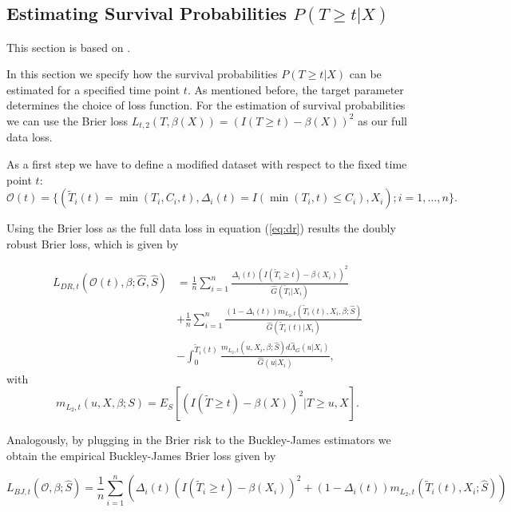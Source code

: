 \documentclass[12pt, a4paper]{article}
\theoremstyle{definition}
\theoremstyle{plain}
\numberwithin{equation}{section}
\numberwithin{figure}{section}
\numberwithin{table}{section}
\begin{document}
	\subsection{Estimating Survival Probabilities $P(T\geq t \vert X)$}
	
	This section is based on \citet*{basearticle}.
	
	In this section we specify how the survival probabilities $P(T\geq t \vert X)$ can be estimated for a specified time point $t$.
	As mentioned before, the target parameter determines the choice of loss function.
	For the estimation of survival probabilities we can use the Brier loss $L_{t,2}(T, \beta(X)) = (I(T \geq t) - \beta(X))^2$ as our full data loss.
	
	As a first step we have to define a modified dataset with respect to the fixed time point $t$:
	\begin{equation*}
		\mathcal{O}(t) = \{(\tilde{T}_i(t)=\min(T_i, C_i, t), \Delta_i(t) = I(\min(T_i, t) \leq C_i), X_i); i = 1,\dots,n\}.
	\end{equation*}
	
	Using the Brier loss as the full data loss in equation (\ref{eq:dr}) results the doubly robust Brier loss, which is given by
	
	\begin{equation*}
	\begin{split}
		L_{DR, t}(\mathcal{O}(t),\beta; \hat{G},\hat{S}) &=  \frac{1}{n} \sum_{i=1}^n \frac{\Delta_i(t)(I(\tilde{T}_i \geq t)-\beta(X_i))^2}{\hat{G}(\tilde{T}_i \vert X_i)}\\
		& + \frac{1}{n} \sum_{i=1}^n \frac{(1-\Delta_i(t))m_{L_2,t}(\tilde{T}_i(t),X_i,\beta; \hat{S})}{\hat{G}(\tilde{T}_i(t) \vert X_i)}\\
		& - \int_{0}^{\tilde{T}_i(t)} \frac{m_{L_2,t}(u,X_i,\beta; \hat{S})d\hat{\Lambda}_G(u\vert X_i)}{\hat{G}(u \vert X_i)},
	\end{split}
	\end{equation*}
	 with
	 \begin{equation*}
	 	m_{L_2,t}(u,X,\beta;S) = E_S[(I(\tilde{T}\geq t)-\beta(X))^2 \vert T \geq u, X].
	 \end{equation*}
	
	Analogously, by plugging in the Brier risk to the Buckley-James estimators we obtain the empirical Buckley-James Brier loss given by
	
	\begin{equation*}
		L_{BJ,t}(\mathcal{O},\beta; \hat{S}) = \frac{1}{n} \sum_{i=1}^n \left( \Delta_i(t)(I(\tilde{T}_i\geq t)-\beta(X_i))^2 + (1- \Delta_i(t))m_{L_2,t}(\tilde{T}_i(t), X_i; \hat{S})\right)
	\end{equation*}
	
\end{document}
